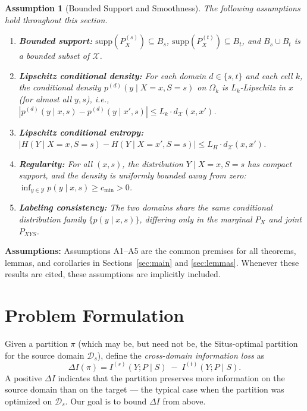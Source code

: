 \documentclass[12pt,a4paper]{article}
\newtheorem{assumption}[theorem]{Assumption}
\newcommand{\cX}{\mathcal{X}}
\newcommand{\cY}{\mathcal{Y}}
\newcommand{\cD}{\mathcal{D}}
\newcommand{\supp}{\mathrm{supp}}
\newcommand{\premise}{\textbf{Assumptions: }}
\begin{document}
\begin{assumption}[Bounded Support and Smoothness]
\label{ass:bounded}
The following assumptions hold throughout this section.
\begin{enumerate}[label=(A\arabic*)]
    \item \textbf{Bounded support:} $\supp(P_X^{(s)})\subseteq B_s$,
          $\supp(P_X^{(t)})\subseteq B_t$, and $B_s\cup B_t$ is a bounded
          subset of $\cX$.
    \item \textbf{Lipschitz conditional density:} For each domain $d\in\{s,t\}$ and each
          cell $k$, the conditional density $p^{(d)}(y\mid X=x,S=s)$ on $\Omega_k$
          is $L_k$-Lipschitz in $x$ (for almost all $y,s$),
          i.e., $|p^{(d)}(y\mid x,s)-p^{(d)}(y\mid x',s)|
          \leq L_k\cdot d_{\cX}(x,x')$.
    \item \textbf{Lipschitz conditional entropy:}
          $|H(Y\mid X=x,S=s)-H(Y\mid X=x',S=s)|
          \leq L_H\cdot d_{\cX}(x,x')$.
    \item \textbf{Regularity:} For all $(x,s)$, the distribution $Y\mid X=x,S=s$
          has compact support, and the density is uniformly bounded away from zero:
          $\inf_{y\in\cY} p(y\mid x,s)\geq c_{\min}>0$.
    \item \textbf{Labeling consistency:} The two domains share the same conditional distribution family
          $\{p(y\mid x,s)\}$, differing only in the marginal $P_X$ and joint $P_{XYS}$.
\end{enumerate}
\end{assumption}

\premise Assumptions A1--A5 are the common premises for all theorems, lemmas, and corollaries in Sections~\ref{sec:main} and \ref{sec:lemmas}. Whenever these results are cited, these assumptions are implicitly included.

\section{Problem Formulation}
\label{sec:formulation}

Given a partition $\pi$ (which may be, but need not be, the Situs-optimal
partition for the source domain $\cD_s$), define the \emph{cross-domain
information loss} as
\begin{equation}\label{eq:delta-I}
    \Delta I(\pi) = I^{(s)}(Y;P\mid S) \;-\; I^{(t)}(Y;P\mid S).
\end{equation}
A positive $\Delta I$ indicates that the partition preserves more
information on the source domain than on the target --- the typical case
when the partition was optimized on $\cD_s$.  Our goal is to bound
$\Delta I$ from above.
\end{document}
